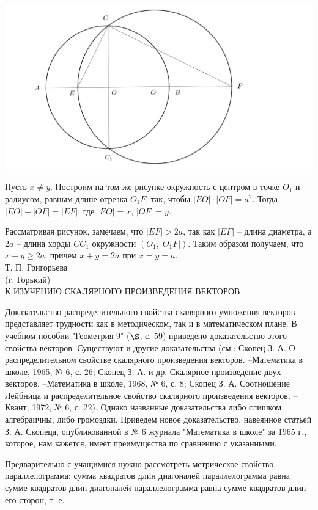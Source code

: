 \documentclass{article}
\begin{document}
\\
\includegraphics[scale=0.25]{ulimaeva.png}
\par Пусть $x\neq y$. Построим на том же рисунке окружность с центром в точке $O_1$ и радиусом, равным длине отрезка $O_1F$, так, чтобы $|EO|\cdot|OF|=a^2$. Тогда $|EO|+|OF|=|EF|$, где $|EO|=x$, $|OF|=y$.
\par Рассматривая рисунок, замечаем, что $|EF|>2a$, так как $|EF|$ -- длина диаметра, а $2a$ -- длина хорды $CC_1$ окружности $(O_1,|O_1F|)$. Таким образом получаем, что $x+y\geqslant2a$, причем $x+y=2a$ при $x=y=a$.
\\Т. П. Григорьева
\\(г. Горький)
\\К ИЗУЧЕНИЮ СКАЛЯРНОГО ПРОИЗВЕДЕНИЯ ВЕКТОРОВ
\par Доказательство распределительного свойства скалярного умножения векторов представляет трудности как в методическом, так и в математическом плане. В учебном пособии "Геометрия 9" ($\S$, с. 59) приведено доказательство этого свойства векторов. Существуют и другие доказательства (см.: Скопец З. А. О распределительном свойстве скалярного произведения векторов. --Математика в школе, 1965, № 6, с. 26; Скопец З. А. и др. Скалярное произведение двух векторов. --Математика в школе, 1968, № 6, с. 8; Скопец З. А. Соотношение Лейбница и распределительное свойство скалярного произведения векторов. --Квант, 1972, № 6, с. 22). Однако названные доказательства либо слишком алгебраичны, либо громоздки. Приведем новое доказательство, навеянное статьей З. А. Скопеца, опубликованной в № 6 журнала "Математика в школе" за 1965 г., которое, нам кажется, имеет преимущества по сравнению с указанными.
\par Предварительно с учащимися нужно рассмотреть метрическое свойство параллелограмма: сумма квадратов длин диагоналей параллелограмма равна сумме квадратов длин диагоналей параллелограмма равна сумме квадратов длин его сторон, т. е.
\end{document}
